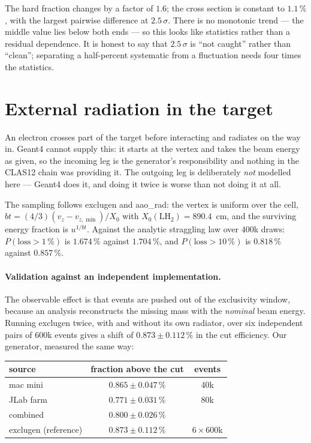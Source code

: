 \documentclass[11pt]{article}
\begin{document}
The hard fraction changes by a factor of $1.6$; the cross section is constant
to $1.1\,\%$, with the largest pairwise difference at $2.5\,\sigma$. There is
no monotonic trend --- the middle value lies below both ends --- so this looks
like statistics rather than a residual dependence. It is honest to say that
$2.5\,\sigma$ is ``not caught'' rather than ``clean''; separating a
half-percent systematic from a fluctuation needs four times the statistics.

\section{External radiation in the target}
\label{sec:ext}

An electron crosses part of the target before interacting and radiates on the
way in. Geant4 cannot supply this: it starts at the vertex and takes the beam
energy as given, so the incoming leg is the generator's responsibility and
nothing in the CLAS12 chain was providing it. The outgoing leg is deliberately
\emph{not} modelled here --- Geant4 does it, and doing it twice is worse than
not doing it at all.

The sampling follows exclugen and aao\_rad: the vertex is uniform over the
cell, $bt=(4/3)(v_z-v_{z,\min})/X_0$ with $X_0(\mathrm{LH_2})=890.4$~cm, and
the surviving energy fraction is $u^{1/bt}$. Against the analytic straggling
law over $400$k draws: $P(\mathrm{loss}>1\,\%)$ is $1.674\,\%$ against
$1.704\,\%$, and $P(\mathrm{loss}>10\,\%)$ is $0.818\,\%$ against $0.857\,\%$.

\paragraph{Validation against an independent implementation.}
The observable effect is that events are pushed out of the exclusivity
window, because an analysis reconstructs the missing mass with the
\emph{nominal} beam energy. Running exclugen twice, with and without its own
radiator, over six independent pairs of $600$k events gives a shift of
$0.873\pm0.112\,\%$ in the cut efficiency. Our generator, measured the same
way:

\begin{center}
\small
\begin{tabular}{lcc}
\toprule
source & fraction above the cut & events \\
\midrule
mac mini            & $0.865\pm0.047\,\%$ & 40k \\
JLab farm           & $0.771\pm0.031\,\%$ & 80k \\
combined            & $\mathbf{0.800\pm0.026\,\%}$ & \\
exclugen (reference)& $0.873\pm0.112\,\%$ & $6\times600$k \\
\bottomrule
\end{tabular}
\end{center}
\end{document}
